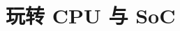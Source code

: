 \documentclass[../../main.tex]{subfiles}
\begin{document}
\chapter{玩转 CPU 与 SoC}
\label{ch:06-soc-integration}





\end{document}
